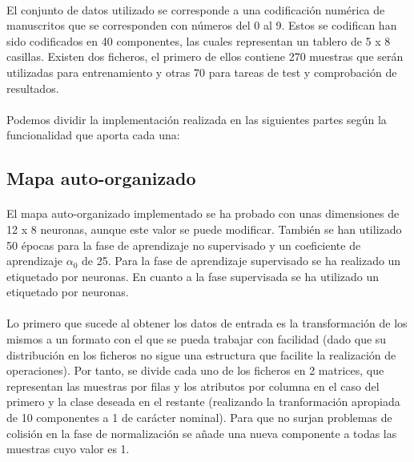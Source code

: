 \documentclass[10pt, a4paper,spanish]{article}
\begin{document}
		\paragraph{}
		El conjunto de datos utilizado se corresponde a una codificación numérica de manuscritos que se corresponden con números del 0 al 9. Estos se codifican han sido codificados en 40 componentes, las cuales representan un tablero de 5 x 8 casillas. Existen dos ficheros, el primero de ellos contiene 270 muestras que serán utilizadas para entrenamiento y otras 70 para tareas de test y comprobación de resultados.



		\paragraph{}
		Podemos dividir la implementación realizada en las siguientes partes según la funcionalidad que aporta cada una:

		\subsection{Mapa auto-organizado}

			\paragraph{}
			El mapa auto-organizado implementado se ha probado con unas dimensiones de 12 x 8 neuronas, aunque este valor se puede modificar. También se han utilizado 50 épocas para la fase de aprendizaje no supervisado y un coeficiente de aprendizaje $\alpha_0$ de 25. Para la fase de aprendizaje supervisado se ha realizado un etiquetado por neuronas. En cuanto a la fase supervisada se ha utilizado un etiquetado por neuronas.

			\paragraph{}
			Lo primero que sucede al obtener los datos de entrada es la transformación de los mismos a un formato con el que se pueda trabajar con facilidad (dado que su distribución en los ficheros no sigue una estructura que facilite la realización de operaciones). Por tanto, se divide cada uno de los ficheros en 2 matrices, que representan las muestras por filas y los atributos por columna en el caso del primero y la clase deseada en el restante (realizando la tranformación apropiada de 10 componentes a 1 de carácter nominal). Para que no surjan problemas de colisión en la fase de normalización se añade una nueva componente a todas las muestras cuyo valor es 1.
\end{document}
